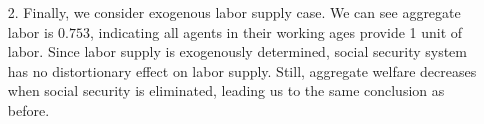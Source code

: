 \documentclass[11pt]{article} %
\begin{document}
\begin{itemize}
\begin{itemize}
	\item[2.] Finally, we consider exogenous labor supply case. We can see aggregate labor is $0.753$, indicating all agents in their working ages provide 1 unit of labor. Since labor supply is exogenously determined, social security system has no distortionary effect on labor supply. Still, aggregate welfare decreases when social security is eliminated, leading us to the same conclusion as before.
\end{itemize}
\end{itemize}

	
\end{document}
